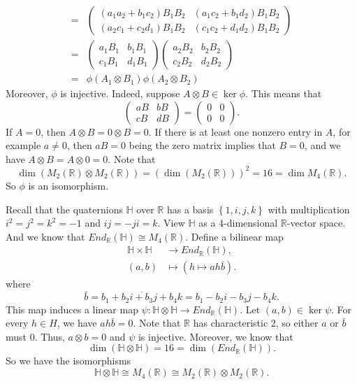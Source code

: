 \documentclass[a4paper, 12pt]{article}
\begin{document}
\begin{solution}
\begin{align*}
   =&\begin{pmatrix}
    (a_1a_2+b_1c_2)B_1B_2&(a_1c_2+b_1d_2)B_1B_2\\ 
    (a_2c_1+c_2d_1)B_1B_2&(c_1c_2+d_1d_2)B_1B_2
   \end{pmatrix}\\[1em] 
   =&\begin{pmatrix}
    a_1B_1&b_1B_1\\ 
    c_1B_1&d_1B_1
   \end{pmatrix}\begin{pmatrix}
    a_2B_2&b_2B_2\\ 
    c_2B_2&d_2B_2
   \end{pmatrix}\\[1em]
   =&\phi(A_1\otimes B_1)\phi(A_2\otimes B_2)
\end{align*}
Moreover, \(\phi\) is injective. Indeed, suppose \(A\otimes B\in \ker \phi\). This means that 
\[\begin{pmatrix}
    aB &bB\\
    cB &dB
\end{pmatrix}=\begin{pmatrix}
    0&0\\ 
    0&0
\end{pmatrix}.\]
If \(A=0\), then \(A\otimes B=0\otimes B=0\). If there is at least one nonzero entry in \(A\), for example \(a\neq 0\), then \(aB=0\) being the zero matrix implies 
that \(B=0\), and we have \(A\otimes B=A\otimes 0=0\). Note that 
\[\dim (M_2(\mathbb{R})\otimes M_2(\mathbb{R}))=(\dim(M_2(\mathbb{R})))^2=16=\dim M_4(\mathbb{R}).\]
So \(\phi\) is an isomorphism. 

Recall that the quaternions \(\mathbb{H}\) over \(\mathbb{R}\) has a basis \(\left\{ 1,i,j,k \right\}\) with multiplication \(i^2=j^2=k^2=-1\) and \(ij=-ji=k\). View \(\mathbb{H}\) as a 4-dimensional 
\(\mathbb{R}\)-vector space. And we know that \(End_{\mathbb{R}}(\mathbb{H})\cong M_4(\mathbb{R})\). Define a bilinear map 
\begin{align*}
    \mathbb{H}\times \mathbb{H}&\rightarrow End_{\mathbb{R}}(\mathbb{H}),\\ 
    (a,b)&\mapsto (h\mapsto ah\bar{b}).
\end{align*}
where 
\[\bar{b}=\overline{b_1+b_2i+b_3j+b_4k}=b_1-b_2i-b_3j-b_4k.\]
This map induces a linear map \(\psi:\mathbb{H}\otimes \mathbb{H}\rightarrow End_{\mathbb{R}}(\mathbb{H})\). Let \((a,b)\in \ker \psi\). For every \(h\in H\), we have 
\(ah\bar{b}=0\). Note that \(\mathbb{R}\) has characteristic 2, so either \(a\) or \(\bar{b}\) must \(0\). Thus, \(a\otimes b=0\) and \(\psi\) is injective. Moreover, we know that 
\[\dim(\mathbb{H}\otimes \mathbb{H})=16=\dim (End_{\mathbb{R}}(\mathbb{H})).\]
So we have the isomorphisms 
\[\mathbb{H}\otimes \mathbb{H}\cong M_4(\mathbb{R})\cong M_2(\mathbb{R})\otimes M_2(\mathbb{R}).\]
\end{solution}
\end{document}
